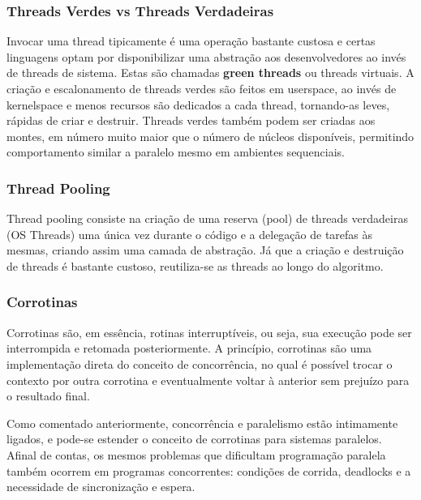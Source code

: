 \documentclass[12pt,a4paper]{article}
\begin{document}
\subsubsection{Threads Verdes vs Threads Verdadeiras}
\label{sssec:threads verdes}

Invocar uma thread tipicamente é uma operação bastante custosa e certas linguagens optam por disponibilizar uma abstração aos desenvolvedores ao invés de threads de sistema. Estas são chamadas \textbf{green threads} ou threads virtuais. A criação e escalonamento de threads verdes são feitos em userspace, ao invés de kernelspace e menos recursos são dedicados a cada thread, tornando-as leves, rápidas de criar e destruir. Threads verdes também podem ser criadas aos montes, em número muito maior que o número de núcleos disponíveis, permitindo comportamento similar a paralelo mesmo em ambientes sequenciais.

\subsubsection{Thread Pooling}
\label{sssec:thread pooling}

Thread pooling consiste na criação de uma reserva (pool) de threads verdadeiras (OS Threads) uma única vez durante o código e a delegação de tarefas às mesmas, criando assim uma camada de abstração. Já que a criação e destruição de threads é bastante custoso, reutiliza-se as threads ao longo do algoritmo.

\subsubsection{Corrotinas}
\label{sssec:corrotina}

Corrotinas são, em essência, rotinas interruptíveis, ou seja, sua execução pode ser interrompida e retomada posteriormente. A princípio, corrotinas são uma implementação direta do conceito de concorrência, no qual é possível trocar o contexto por outra corrotina e eventualmente voltar à anterior sem prejuízo para o resultado final.

Como comentado anteriormente, concorrência e paralelismo estão intimamente ligados, e pode-se estender o conceito de corrotinas para sistemas paralelos. Afinal de contas, os mesmos problemas que dificultam programação paralela também ocorrem em programas concorrentes: condições de corrida, deadlocks e a necessidade de sincronização e espera.


\newpage
\end{document}
